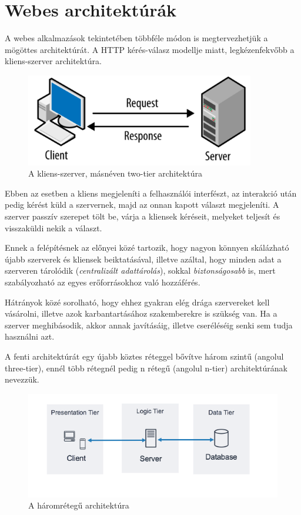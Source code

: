 \documentclass[
]{thesis-ekf}
\theoremstyle{definition}
\theoremstyle{remark}
\begin{document}
\section{Webes architektúrák}
A webes alkalmazások tekintetében többféle módon is megtervezhetjük a mögöttes architektúrát.
A HTTP kérés-válasz modellje miatt, legkézenfekvőbb a kliens-szerver architektúra.
\begin{figure}[!ht]
	\centering
	\includegraphics[width=10cm]{kepek/client_server_arch.png}
	\caption{A kliens-szerver, másnéven two-tier architektúra} %
\end{figure}

Ebben az esetben a kliens megjeleníti a felhasználói interfészt, az interakció után pedig kérést küld a szervernek, majd az onnan kapott választ megjeleníti.
A szerver passzív szerepet tölt be, várja a kliensek kéréseit, melyeket teljesít és visszaküldi nekik a választ.

Ennek a felépítésnek az előnyei közé tartozik, hogy nagyon könnyen skálázható újabb szerverek és kliensek beiktatásával, illetve azáltal, hogy minden adat a szerveren tárolódik (\emph{centralizált adattárolás}), sokkal \emph{biztonságosabb} is, mert szabályozható az egyes erőforrásokhoz való hozzáférés.

Hátrányok közé sorolható, hogy ehhez gyakran elég drága szervereket kell vásárolni, illetve azok karbantartásához szakemberekre is szükség van. Ha a szerver meghibásodik, akkor annak javításáig, illetve cseréléséig senki sem tudja használni azt.

A fenti architektúrát egy újabb köztes réteggel bővítve három szintű (angolul three-tier), ennél több rétegnél pedig n rétegű (angolul n-tier) architektúrának nevezzük.

\begin{figure}[!ht]
	\centering
	\includegraphics[width=12cm]{kepek/three_tier_arch.png}
	\caption{A háromrétegű architektúra}
\end{figure}
\end{document}

